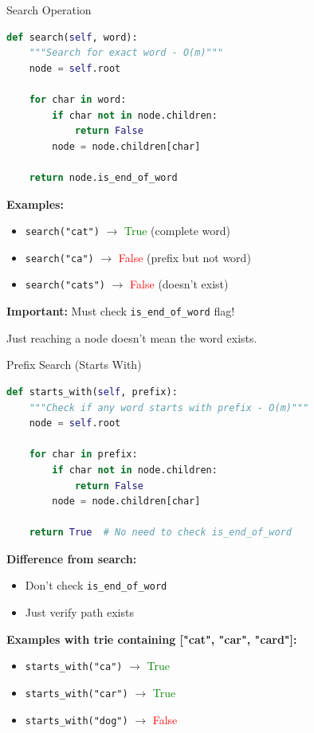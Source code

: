 \documentclass[aspectratio=169]{beamer}
\begin{document}
\begin{frame}[fragile]{Search Operation}
  \begin{lstlisting}[language=Python, basicstyle=\ttfamily\small]
def search(self, word):
    """Search for exact word - O(m)"""
    node = self.root

    for char in word:
        if char not in node.children:
            return False
        node = node.children[char]

    return node.is_end_of_word
  \end{lstlisting}

  \vspace{0.3cm}
  \textbf{Examples:}
  \begin{itemize}
    \item \texttt{search("cat")} $\rightarrow$ \textcolor{green}{True} (complete word)
    \item \texttt{search("ca")} $\rightarrow$ \textcolor{red}{False} (prefix but not word)
    \item \texttt{search("cats")} $\rightarrow$ \textcolor{red}{False} (doesn't exist)
  \end{itemize}

  \vspace{0.3cm}
  \textbf{Important:} Must check \texttt{is\_end\_of\_word} flag!

  Just reaching a node doesn't mean the word exists.
\end{frame}

\begin{frame}[fragile]{Prefix Search (Starts With)}
  \begin{lstlisting}[language=Python, basicstyle=\ttfamily\small]
def starts_with(self, prefix):
    """Check if any word starts with prefix - O(m)"""
    node = self.root

    for char in prefix:
        if char not in node.children:
            return False
        node = node.children[char]

    return True  # No need to check is_end_of_word
  \end{lstlisting}

  \vspace{0.3cm}
  \textbf{Difference from search:}
  \begin{itemize}
    \item Don't check \texttt{is\_end\_of\_word}
    \item Just verify path exists
  \end{itemize}

  \vspace{0.3cm}
  \textbf{Examples with trie containing ["cat", "car", "card"]:}
  \begin{itemize}
    \item \texttt{starts\_with("ca")} $\rightarrow$ \textcolor{green}{True}
    \item \texttt{starts\_with("car")} $\rightarrow$ \textcolor{green}{True}
    \item \texttt{starts\_with("dog")} $\rightarrow$ \textcolor{red}{False}
  \end{itemize}
\end{frame}
\end{document}
